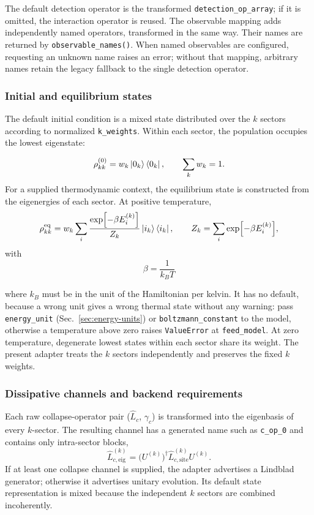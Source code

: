 \documentclass[11pt]{article}
\begin{document}
The default detection operator is the transformed \texttt{detection\_op\_array}; if it is omitted, the interaction operator is reused. The observable mapping adds independently named operators, transformed in the same way. Their names are returned by \texttt{observable\_names()}. When named observables are configured, requesting an unknown name raises an error; without that mapping, arbitrary names retain the legacy fallback to the single detection operator.


\subsubsection{Initial and equilibrium states}

The default initial condition is a mixed state distributed over the $k$ sectors according to normalized \texttt{k\_weights}. Within each sector, the population occupies the lowest eigenstate:

\begin{equation}
    \rho^{(0)}_{kk}=w_k\ket{0_k}\bra{0_k},
    \qquad \sum_k w_k=1.
\end{equation}
For a supplied thermodynamic context, the equilibrium state is constructed from the eigenergies of each sector. At positive temperature,
\begin{equation}
    \rho_{kk}^{\mathrm{eq}}=w_k\sum_i
    \frac{\exp[-\beta E_i^{(k)}]}{Z_k}\ket{i_k}\bra{i_k},
    \qquad Z_k=\sum_i\exp[-\beta E_i^{(k)}],
\end{equation}
with 
\begin{equation}
    \beta = \frac{1}{k_B T}
\end{equation}

where $k_B$ must be in the unit of the Hamiltonian per kelvin. It has no default, because a wrong unit gives a wrong thermal state without any warning: pass \texttt{energy\_unit} (Sec.~\ref{sec:energy-units}) or \texttt{boltzmann\_constant} to the model, otherwise a temperature above zero raises \texttt{ValueError} at \texttt{feed\_model}. At zero temperature, degenerate lowest states within each sector share its weight. The present adapter treats the $k$ sectors independently and preserves the fixed $k$ weights.

\subsubsection{Dissipative channels and backend requirements}
Each raw collapse-operator pair ($\hat{L}_c$, $\gamma_c$) is transformed into the eigenbasis of every $k$-sector. The resulting channel has a generated name such as \texttt{c\_op\_0} and contains only intra-sector blocks, 
\begin{equation}
    \hat{L}_{c,\mathrm{eig}}^{(k)} = \big( U^{(k)} \big)^\dagger \hat{L}_{c,\mathrm{site}}^{(k)} U^{(k)}.
\end{equation}
If at least one collapse channel is supplied, the adapter advertises a Lindblad generator; otherwise it advertises unitary evolution. Its default state representation is mixed because the independent $k$ sectors are combined incoherently.
\end{document}
